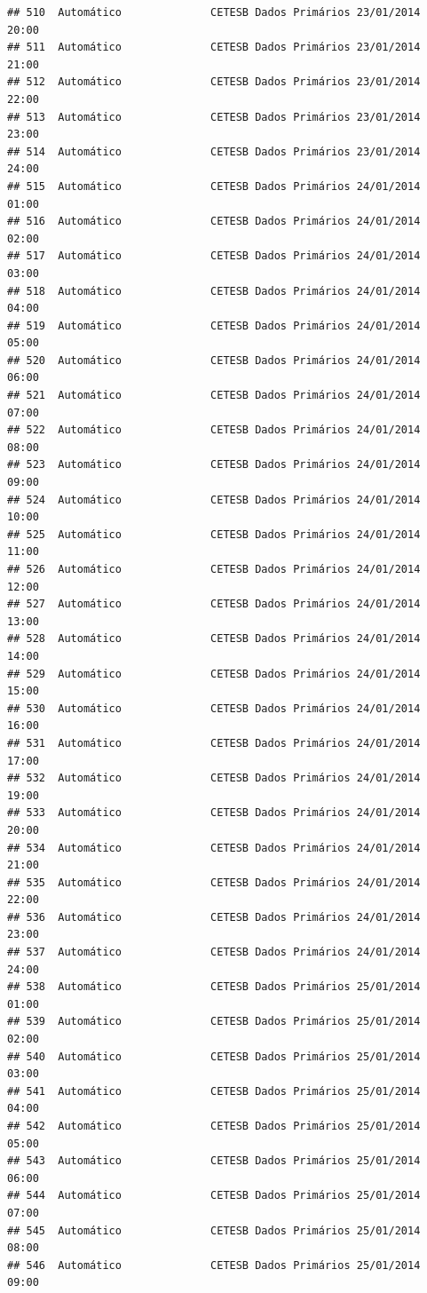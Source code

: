 \documentclass[]{book}
\begin{document}
\begin{verbatim}
## 510  Automático              CETESB Dados Primários 23/01/2014 20:00
## 511  Automático              CETESB Dados Primários 23/01/2014 21:00
## 512  Automático              CETESB Dados Primários 23/01/2014 22:00
## 513  Automático              CETESB Dados Primários 23/01/2014 23:00
## 514  Automático              CETESB Dados Primários 23/01/2014 24:00
## 515  Automático              CETESB Dados Primários 24/01/2014 01:00
## 516  Automático              CETESB Dados Primários 24/01/2014 02:00
## 517  Automático              CETESB Dados Primários 24/01/2014 03:00
## 518  Automático              CETESB Dados Primários 24/01/2014 04:00
## 519  Automático              CETESB Dados Primários 24/01/2014 05:00
## 520  Automático              CETESB Dados Primários 24/01/2014 06:00
## 521  Automático              CETESB Dados Primários 24/01/2014 07:00
## 522  Automático              CETESB Dados Primários 24/01/2014 08:00
## 523  Automático              CETESB Dados Primários 24/01/2014 09:00
## 524  Automático              CETESB Dados Primários 24/01/2014 10:00
## 525  Automático              CETESB Dados Primários 24/01/2014 11:00
## 526  Automático              CETESB Dados Primários 24/01/2014 12:00
## 527  Automático              CETESB Dados Primários 24/01/2014 13:00
## 528  Automático              CETESB Dados Primários 24/01/2014 14:00
## 529  Automático              CETESB Dados Primários 24/01/2014 15:00
## 530  Automático              CETESB Dados Primários 24/01/2014 16:00
## 531  Automático              CETESB Dados Primários 24/01/2014 17:00
## 532  Automático              CETESB Dados Primários 24/01/2014 19:00
## 533  Automático              CETESB Dados Primários 24/01/2014 20:00
## 534  Automático              CETESB Dados Primários 24/01/2014 21:00
## 535  Automático              CETESB Dados Primários 24/01/2014 22:00
## 536  Automático              CETESB Dados Primários 24/01/2014 23:00
## 537  Automático              CETESB Dados Primários 24/01/2014 24:00
## 538  Automático              CETESB Dados Primários 25/01/2014 01:00
## 539  Automático              CETESB Dados Primários 25/01/2014 02:00
## 540  Automático              CETESB Dados Primários 25/01/2014 03:00
## 541  Automático              CETESB Dados Primários 25/01/2014 04:00
## 542  Automático              CETESB Dados Primários 25/01/2014 05:00
## 543  Automático              CETESB Dados Primários 25/01/2014 06:00
## 544  Automático              CETESB Dados Primários 25/01/2014 07:00
## 545  Automático              CETESB Dados Primários 25/01/2014 08:00
## 546  Automático              CETESB Dados Primários 25/01/2014 09:00

\end{verbatim}
\end{document}
